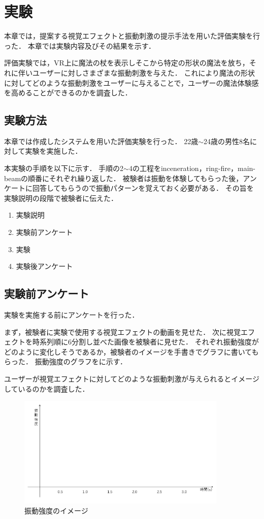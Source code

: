 \chapter{実験}
本章では，提案する視覚エフェクトと振動刺激の提示手法を用いた評価実験を行った．
本章では実験内容及びその結果を示す．

評価実験では，VR上に魔法の杖を表示しそこから特定の形状の魔法を放ち，それに伴いユーザーに対しさまざまな振動刺激を与えた．
これにより魔法の形状に対してどのような振動刺激をユーザーに与えることで，ユーザーの魔法体験感を高めることができるのかを調査した．

\section{実験方法}
本章では作成したシステムを用いた評価実験を行った．
22歳$\sim$24歳の男性8名に対して実験を実施した．

本実験の手順を以下に示す．
手順の2$\sim$4の工程をinceneration，ring-fire，main-beamの順番にそれぞれ繰り返した．
被験者は振動を体験してもらった後，アンケートに回答してもらうので振動パターンを覚えておく必要がある．
その旨を実験説明の段階で被験者に伝えた．

\begin{enumerate}
    \item 実験説明
    \item 実験前アンケート
    \item 実験
    \item 実験後アンケート
\end{enumerate}

\newpage
\section{実験前アンケート}
実験を実施する前にアンケートを行った．

まず，被験者に実験で使用する視覚エフェクトの動画を見せた．
次に視覚エフェクトを時系列順に6分割し並べた画像を被験者に見せた．
それぞれ振動強度がどのように変化しそうであるか，被験者のイメージを手書きでグラフに書いてもらった．
振動強度のグラフをに示す．

ユーザーが視覚エフェクトに対してどのような振動刺激が与えられるとイメージしているのかを調査した．

\begin{figure}[h]
\centering
\includegraphics[clip,width=10cm]{./fig/ank.png}
\caption{振動強度のイメージ}\label{ank}
\end{figure}

